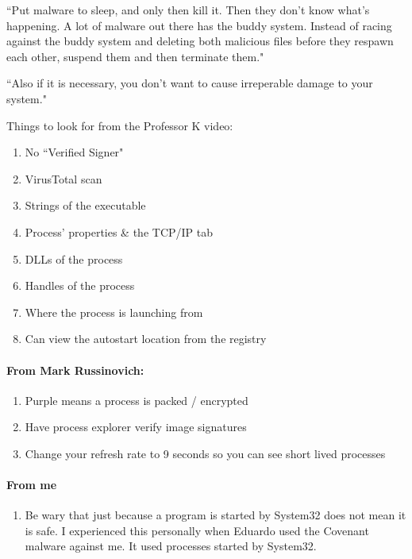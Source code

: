 \documentclass{article}
\begin{document}
``Put malware to sleep, and only then kill it. 
Then they don't know what's happening.
A lot of malware out there has
the buddy system. Instead of racing against the buddy system
and deleting both malicious files before they respawn each other,
suspend them and then terminate them."

``Also if it is necessary, you don't want to cause irreperable damage to your system."

Things to look for from the Professor K video:
\begin{enumerate}
        \item No ``Verified Signer"
        \item VirusTotal scan
        \item Strings of the executable
        \item Process' properties \& the TCP/IP tab
        \item DLLs of the process
        \item Handles of the process
        \item Where the process is launching from
        \item Can view the autostart location from the registry
\end{enumerate}

\paragraph{From Mark Russinovich:}
\begin{enumerate}
        \item Purple means a process is packed / encrypted
        \item Have process explorer verify image signatures
        \item Change your refresh rate to 9 seconds so you can see short lived processes
\end{enumerate}

\paragraph{From me}
\begin{enumerate}
    \item Be wary that just because a program is started by System32 does not mean it is safe. 
    I experienced this personally when Eduardo used the Covenant malware against me. 
    It used processes started by System32.
\end{enumerate}    
\end{document}
